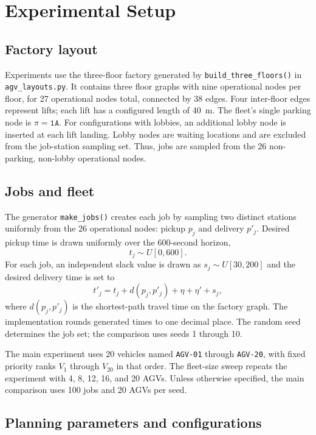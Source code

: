 \documentclass[11pt]{article}
\begin{document}
\section{Experimental Setup}
\label{sec:experimental-setup}

\subsection{Factory layout}

Experiments use the three-floor factory generated by
\texttt{build\_three\_floors()} in \texttt{agv\_layouts.py}. It contains
three floor graphs with nine operational nodes per floor, for 27 operational
nodes total, connected by 38 edges. Four inter-floor edges represent lifts;
each lift has a configured length of 40~m. The fleet's single parking node is
$\pi=\texttt{1A}$. For configurations with lobbies, an additional lobby node
is inserted at each lift landing. Lobby nodes are waiting locations and are
excluded from the job-station sampling set. Thus, jobs are sampled from the
26 non-parking, non-lobby operational nodes.

\subsection{Jobs and fleet}

The generator \texttt{make\_jobs()} creates each job by sampling two distinct
stations uniformly from the 26 operational nodes: pickup $p_j$ and delivery
$p'_j$. Desired pickup time is drawn uniformly over the 600-second horizon,
\[
  t_j\sim U[0,600].
\]
For each job, an independent slack value is drawn as $s_j\sim U[30,200]$ and
the desired delivery time is set to
\[
  t'_j=t_j+d(p_j,p'_j)+\eta+\eta'+s_j,
\]
where $d(p_j,p'_j)$ is the shortest-path travel time on the factory graph.
The implementation rounds generated times to one decimal place. The random
seed determines the job set; the comparison uses seeds 1 through 10.

The main experiment uses 20 vehicles named \texttt{AGV-01} through
\texttt{AGV-20}, with fixed priority ranks $V_1$ through $V_{20}$ in that
order. The fleet-size sweep repeats the experiment with 4, 8, 12, 16, and 20
AGVs. Unless otherwise specified, the main comparison uses 100 jobs and 20
AGVs per seed.

\subsection{Planning parameters and configurations}
\end{document}
